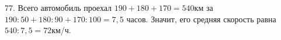 77. Всего автомобиль проехал $190+180+170=540$км за $190:50+180:90+170:100=7,5$ часов. Значит, его средняя скорость равна $540:7,5=72$км/ч.\\
